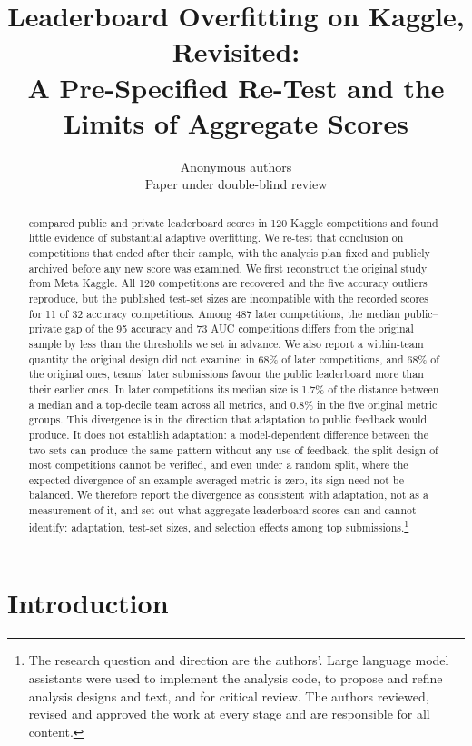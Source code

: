 \documentclass[10pt]{article}
\title{Leaderboard Overfitting on Kaggle, Revisited:\\ A Pre-Specified Re-Test and the Limits of Aggregate Scores}
\author{\name Anonymous authors \\ \addr Paper under double-blind review}
\begin{document}
\maketitle

\begin{abstract}
\citet{roelofs2019meta} compared public and private leaderboard scores in 120 Kaggle competitions and found little evidence of substantial adaptive overfitting. We re-test that conclusion on competitions that ended after their sample, with the analysis plan fixed and publicly archived before any new score was examined. We first reconstruct the original study from Meta Kaggle. All 120 competitions are recovered and the five accuracy outliers reproduce, but the published test-set sizes are incompatible with the recorded scores for 11 of 32 accuracy competitions. Among 487 later competitions, the median public--private gap of the 95 accuracy and 73 AUC competitions differs from the original sample by less than the thresholds we set in advance. We also report a within-team quantity the original design did not examine: in 68\% of later competitions, and 68\% of the original ones, teams' later submissions favour the public leaderboard more than their earlier ones. In later competitions its median size is 1.7\% of the distance between a median and a top-decile team across all metrics, and 0.8\% in the five original metric groups. This divergence is in the direction that adaptation to public feedback would produce. It does not establish adaptation: a model-dependent difference between the two sets can produce the same pattern without any use of feedback, the split design of most competitions cannot be verified, and even under a random split, where the expected divergence of an example-averaged metric is zero, its sign need not be balanced. We therefore report the divergence as consistent with adaptation, not as a measurement of it, and set out what aggregate leaderboard scores can and cannot identify: adaptation, test-set sizes, and selection effects among top submissions.\footnote{The research question and direction are the authors'. Large language model assistants were used to implement the analysis code, to propose and refine analysis designs and text, and for critical review. The authors reviewed, revised and approved the work at every stage and are responsible for all content.}
\end{abstract}

\section{Introduction}
\end{document}
